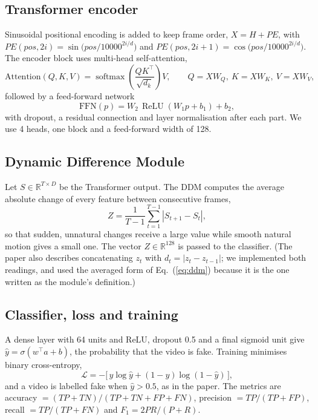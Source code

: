 \documentclass[11pt,a4paper]{article}
\begin{document}
\subsection{Transformer encoder}
Sinusoidal positional encoding is added to keep frame order, $X=H+PE$, with $PE(pos,2i)=\sin\!\big(pos/10000^{2i/d}\big)$ and $PE(pos,2i{+}1)=\cos\!\big(pos/10000^{2i/d}\big)$. The encoder block uses multi-head self-attention,
\begin{equation}
\text{Attention}(Q,K,V)=\operatorname{softmax}\!\left(\frac{QK^{\top}}{\sqrt{d_k}}\right)V,\qquad Q=XW_Q,\ K=XW_K,\ V=XW_V,
\end{equation}
followed by a feed-forward network
\begin{equation}
\text{FFN}(p)=W_2\,\operatorname{ReLU}(W_1p+b_1)+b_2 ,
\end{equation}
with dropout, a residual connection and layer normalisation after each part. We use 4 heads, one block and a feed-forward width of 128.

\subsection{Dynamic Difference Module}
Let $S\in\mathbb{R}^{T\times D}$ be the Transformer output. The DDM computes the average absolute change of every feature between consecutive frames,
\begin{equation}
Z=\frac{1}{T-1}\sum_{t=1}^{T-1}\left|S_{t+1}-S_t\right| ,\label{eq:ddm}
\end{equation}
so that sudden, unnatural changes receive a large value while smooth natural motion gives a small one. The vector $Z\in\mathbb{R}^{128}$ is passed to the classifier. (The paper also describes concatenating $z_t$ with $d_t=|z_t-z_{t-1}|$; we implemented both readings, and used the averaged form of Eq.~(\ref{eq:ddm}) because it is the one written as the module's definition.)

\subsection{Classifier, loss and training}
A dense layer with 64 units and ReLU, dropout 0.5 and a final sigmoid unit give $\hat y=\sigma(w^{\top}a+b)$, the probability that the video is fake. Training minimises binary cross-entropy,
\begin{equation}
\mathcal{L}=-\big[\,y\log\hat y+(1-y)\log(1-\hat y)\,\big],
\end{equation}
and a video is labelled fake when $\hat y>0.5$, as in the paper. The metrics are accuracy $=(TP+TN)/(TP+TN+FP+FN)$, precision $=TP/(TP+FP)$, recall $=TP/(TP+FN)$ and $F_1=2PR/(P+R)$.
\end{document}
